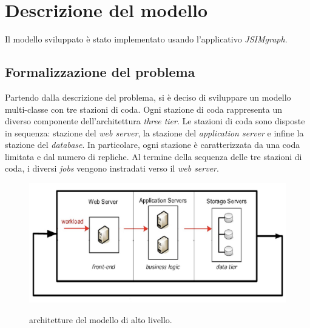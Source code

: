 \documentclass[../main.tex]{subfiles}
\begin{document}
    \chapter{Descrizione del modello}\label{ch:descrizione-del-modello}
    Il modello sviluppato è stato implementato usando l'applicativo \textit{JSIMgraph}.

    \section{Formalizzazione del problema}\label{sec:formalizzazione-del-problema}
    Partendo dalla descrizione del problema, si è deciso di sviluppare un modello multi-classe con tre stazioni di coda.
    Ogni stazione di coda rappresenta un diverso componente dell'architettura \textit{three tier}.
    Le stazioni di coda sono disposte in sequenza: stazione del \textit{web server}, la stazione del
    \textit{application server} e infine la stazione del \textit{database}.
    \newline
    In particolare, ogni stazione è caratterizzata da una coda limitata e dal numero di repliche.
    Al termine della sequenza delle tre stazioni di coda, i diversi \textit{jobs} vengono instradati verso il
    \textit{web server}.

    \begin{figure}[H]
        \includegraphics[scale = 0.3]{assets/three_tier}\\
        \caption[\textit{Architettura} alto livello]{architetture del modello di alto livello.}
        \label{fig:architettura-alto-livello-modello}
    \end{figure}
\end{document}
